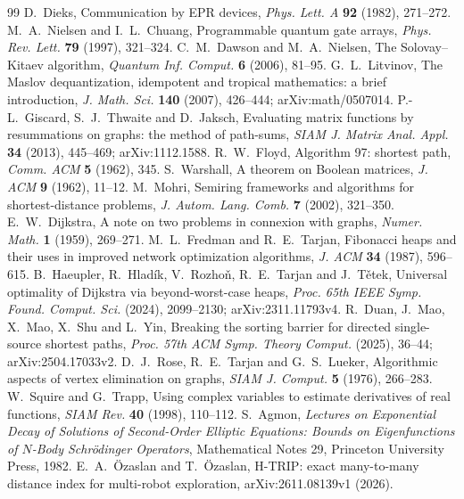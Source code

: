 \documentclass[11pt,reqno]{amsart}
\theoremstyle{definition}
\theoremstyle{remark}
\numberwithin{equation}{section}
\begin{document}
\begin{thebibliography}{99}
 D.~Dieks, Communication by EPR devices, \emph{Phys. Lett. A} \textbf{92} (1982), 271--272.
 M.~A.~Nielsen and I.~L.~Chuang, Programmable quantum gate arrays, \emph{Phys. Rev. Lett.} \textbf{79} (1997), 321--324.
 C.~M.~Dawson and M.~A.~Nielsen, The Solovay--Kitaev algorithm, \emph{Quantum Inf. Comput.} \textbf{6} (2006), 81--95.
 G.~L.~Litvinov, The Maslov dequantization, idempotent and tropical mathematics: a brief introduction, \emph{J. Math. Sci.} \textbf{140} (2007), 426--444; arXiv:math/0507014.
 P.-L.~Giscard, S.~J.~Thwaite and D.~Jaksch, Evaluating matrix functions by resummations on graphs: the method of path-sums, \emph{SIAM J. Matrix Anal. Appl.} \textbf{34} (2013), 445--469; arXiv:1112.1588.
 R.~W.~Floyd, Algorithm 97: shortest path, \emph{Comm. ACM} \textbf{5} (1962), 345.
 S.~Warshall, A theorem on Boolean matrices, \emph{J. ACM} \textbf{9} (1962), 11--12.
 M.~Mohri, Semiring frameworks and algorithms for shortest-distance problems, \emph{J. Autom. Lang. Comb.} \textbf{7} (2002), 321--350.
 E.~W.~Dijkstra, A note on two problems in connexion with graphs, \emph{Numer. Math.} \textbf{1} (1959), 269--271.
 M.~L.~Fredman and R.~E.~Tarjan, Fibonacci heaps and their uses in improved network optimization algorithms, \emph{J. ACM} \textbf{34} (1987), 596--615.
 B.~Haeupler, R.~Hlad\'ik, V.~Rozho\v{n}, R.~E.~Tarjan and J.~T\v{e}tek, Universal optimality of Dijkstra via beyond-worst-case heaps, \emph{Proc. 65th IEEE Symp. Found. Comput. Sci.} (2024), 2099--2130; arXiv:2311.11793v4.
 R.~Duan, J.~Mao, X.~Mao, X.~Shu and L.~Yin, Breaking the sorting barrier for directed single-source shortest paths, \emph{Proc. 57th ACM Symp. Theory Comput.} (2025), 36--44; arXiv:2504.17033v2.
 D.~J.~Rose, R.~E.~Tarjan and G.~S.~Lueker, Algorithmic aspects of vertex elimination on graphs, \emph{SIAM J. Comput.} \textbf{5} (1976), 266--283.
 W.~Squire and G.~Trapp, Using complex variables to estimate derivatives of real functions, \emph{SIAM Rev.} \textbf{40} (1998), 110--112.
 S.~Agmon, \emph{Lectures on Exponential Decay of Solutions of Second-Order Elliptic Equations: Bounds on Eigenfunctions of \(N\)-Body Schr\"odinger Operators}, Mathematical Notes 29, Princeton University Press, 1982.
 E.~A.~\"Ozaslan and T.~\"Ozaslan, H-TRIP: exact many-to-many distance index for multi-robot exploration, arXiv:2611.08139v1 (2026).

\end{thebibliography}
\end{document}
